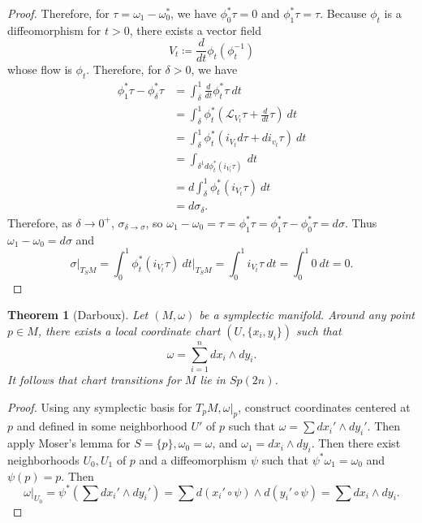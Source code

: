 \documentclass[leqno, openany]{memoir}
\newtheorem{thm}{Theorem}[chapter]
\theoremstyle{definition}
\theoremstyle{remark}
\theoremstyle{plain}
\theoremstyle{definition}
\theoremstyle{remark}
\newcommand{\mc}[1]{\mathcal{#1}}
\begin{document}
\begin{proof}
    Therefore, for $\tau = \omega_1 - \omega_0^*$, we have $\phi_0^* \tau = 0$ and $\phi_1^* \tau = \tau$. Because $\phi_t$ is a diffeomorphism for $t > 0$, there exists a vector field
    \[ V_t \coloneqq \frac{d}{dt} \phi_t (\phi_t^{-1}) \]
    whose flow is $\phi_t$.
    Therefore, for $\delta > 0$, we have
    \begin{align*}
        \phi_1^* \tau - \phi_{\delta}^* \tau &= \int_{\delta}^1 \frac{d}{dt} \phi_t^* \tau \ dt \\
                                             &= \int_{\delta}^1 \phi_t^* \left( \mc{L}_{V_t} \tau + \frac{d}{dt} \tau \right)\ dt \\
                                             &= \int_{\delta}^1 \phi_t^* (i_{V_t} d \tau + d i_{v_t} \tau)\ dt \\
                                             &= \int_{\delta^1 d \phi_t^* (i_{V_t} \tau)}\ dt \\
                                             &= d \int_{\delta}^1 \phi_t^* (i_{V_t} \tau)\ dt \\
                                             &= d \sigma_{\delta}.
    \end{align*}
    Therefore, as $\delta \to 0^+$, $\sigma_{\delta \to \sigma}$, so $\omega_1 - \omega_0 = \tau = \phi_1^* \tau = \phi_1^* \tau - \phi_0^* \tau = d \sigma$. Thus $\omega_1 - \omega_0 = d \sigma$ and
    \[ \sigma |_{T_S M} = \int_0^1 \phi_t^* (i_{V_t} \tau)\ dt \bigg \vert_{T_S M} = \int_0^1 i_{V_t} \tau\ dt = \int_0^1 0\ dt = 0.\]
\end{proof}

    \begin{thm}[Darboux]
        Let $(M, \omega)$ be a symplectic manifold. Around any point $p \in M$, there exists a local coordinate chart $(U, \{x_i, y_i \})$ such that 
        \[ \omega = \sum_{i=1}^n dx_i \wedge dy_i. \]
        It follows that chart transitions for $M$ lie in $Sp(2n)$.
    \end{thm}

    \begin{proof}
        Using any symplectic basis for $T_p M, \omega|_p$, construct coordinates centered at $p$ and defined in some neighborhood $U'$ of $p$ such that $\omega = \sum dx_i' \wedge dy_i'$. Then apply Moser's lemma for $S = \{p\}, \omega_0 = \omega$, and $\omega_1 = dx_i \wedge dy_i$. Then there exist neighborhoods $U_0, U_1$ of $p$ and a diffeomorphism $\psi$ such that $\psi^* \omega_1 = \omega_0$ and $\psi(p) = p$. Then 
        \[ \omega |_{U_0} = \psi^* \left( \sum dx_i' \wedge dy_i' \right) = \sum d(x_i' \circ \psi) \wedge d(y_i' \circ \psi) = \sum dx_i \wedge dy_i. \]
    \end{proof}
\end{document}
